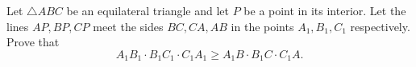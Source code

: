 Let $\triangle ABC$ be an equilateral triangle and let $P$ be a point in its interior. Let the lines $AP, BP, CP$ meet the sides $BC, CA, AB$ in the points $A_1, B_1, C_1$ respectively. Prove that
\[ A_1B_1 \cdot B_1C_1 \cdot C_1A_1 \geq A_1B \cdot B_1C \cdot C_1A. \]
